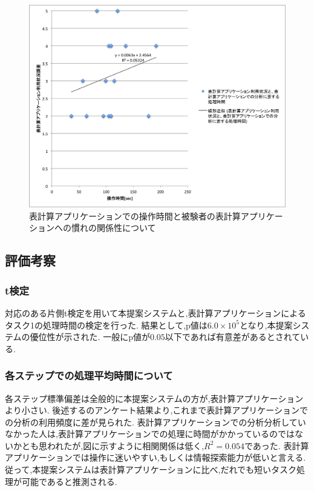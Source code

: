 \documentclass[sotsuron]{kuee}
\begin{document}
			\begin{figure}
				\begin{center}
					\includegraphics[width=\linewidth]{./png/result05.png}
				\end{center}
				\caption{表計算アプリケーションでの操作時間と被験者の表計算アプリケーションへの慣れの関係性について}
		  		\label{fig:result05}
			\end{figure}
		\subsection{評価考察}
			\subsubsection{t検定}
				対応のある片側t検定を用いて本提案システムと,表計算アプリケーションによるタスク1の処理時間の検定を行った. 
				結果として,p値は$6. 0 \times 10^5$となり,本提案システムの優位性が示された. 
				一般にp値が$0. 05$以下であれば有意差があるとされている. 
			\subsubsection{各ステップでの処理平均時間について}
				各ステップ標準偏差は全般的に本提案システムの方が,表計算アプリケーションより小さい. 
				後述するのアンケート結果より,これまで表計算アプリケーションでの分析の利用頻度に差が見られた. 表計算アプリケーションでの分析分析していなかった人は,表計算アプリケーションでの処理に時間がかかっているのではないかとも思われたが,図に示すように相関関係は低く,$R^2 = 0. 054$であった. 
				表計算アプリケーションでは操作に迷いやすい,もしくは情報探索能力が低いと言える. 
				従って,本提案システムは表計算アプリケーションに比べ,だれでも短いタスク処理が可能であると推測される. 
\end{document}

